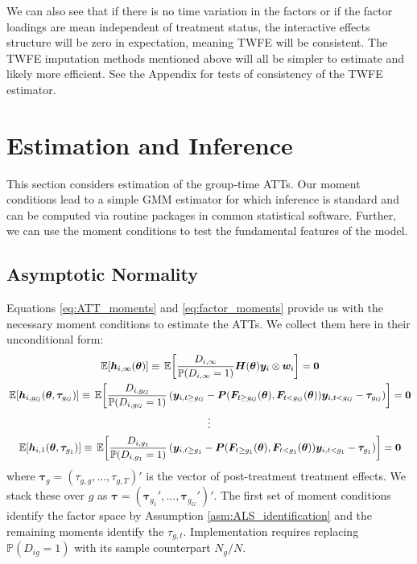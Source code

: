 \documentclass[12pt]{article}
\begin{document}
We can also see that if there is no time variation in the factors or if the factor loadings are mean independent of treatment status, the interactive effects structure will be zero in expectation, meaning TWFE will be consistent. The TWFE imputation methods mentioned above will all be simpler to estimate and likely more efficient. See the Appendix for tests of consistency of the TWFE estimator. 




\section{Estimation and Inference}\label{sec:estimation}

This section considers estimation of the group-time ATTs. Our moment conditions lead to a simple GMM estimator for which inference is standard and can be computed via routine packages in common statistical software. Further, we can use the moment conditions to test the fundamental features of the model.

\subsection{Asymptotic Normality}

Equations \eqref{eq:ATT_moments} and \eqref{eq:factor_moments} provide us with the necessary moment conditions to estimate the ATTs. We collect them here in their unconditional form: 
\begin{gather*}
  \expec{\bm h_{i, \infty}(\bm \theta)} \equiv \expec{\frac{D_{i, \infty}}{\mathbb{P}(D_{i, \infty} = 1)}\bm H(\bm \theta) \bm y_i \otimes \bm w_i} = \bm 0\\
  \expec{\bm h_{i, g_G}(\bm{\theta}, \bm \tau_{g_G})} \equiv \expec{ \frac{D_{i, g_G}}{\mathbb{P}(D_{i, g_G} = 1) } \left( \bm y_{i, t \geq g_G} - \bm P(\bm{F}_{t \geq g_G}(\bm{\theta}), \bm{F}_{t < g_G}(\bm{\theta})) \bm y_{i, t < g_G} - \bm \tau_{g_G} \right)} = \bm 0\\
  \vdots\\
  \expec{\bm h_{i, 1}(\bm{\theta}, \bm \tau_{g_1})} \equiv \expec{ \frac{D_{i, g_1}}{\mathbb{P}(D_{i, g_1} = 1) } \left( \bm y_{i, t \geq g_1} - \bm P(\bm{F}_{t \geq g_1}(\bm{\theta}), \bm{F}_{t < g_1}(\bm{\theta})) \bm y_{i, t < g_1} - \bm \tau_{g_1} \right)} = \bm 0
\end{gather*}
where $\bm \tau_g = (\tau_{g,g},...,\tau_{g,T})'$ is the vector of post-treatment treatment effects. We stack these over $g$ as $\bm \tau = (\bm \tau_{g_1}',...,\bm \tau_{g_G}')'$. The first set of moment conditions identify the factor space by Assumption \ref{asm:ALS_identification} and the remaining moments identify the $\tau_{g,t}$. Implementation requires replacing $\mathbb{P}(D_{ig} = 1)$ with its sample counterpart $N_g/N$. 
\end{document}
